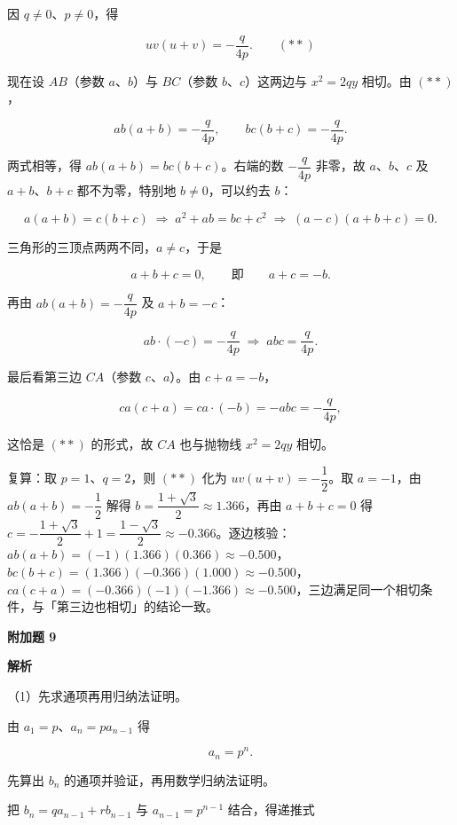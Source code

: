 \begin{answer}
因 $q\ne0$、$p\ne0$，得

\nopagebreak[4]
\[
uv(u+v)=-\frac{q}{4p}. \qquad (\ast\ast)
\]

现在设 $AB$（参数 $a$、$b$）与 $BC$（参数 $b$、$c$）这两边与 $x^2=2qy$ 相切。由 $(\ast\ast)$，

\nopagebreak[4]
\[
ab(a+b)=-\frac{q}{4p},\qquad bc(b+c)=-\frac{q}{4p}.
\]

两式相等，得 $ab(a+b)=bc(b+c)$。右端的数 $-\dfrac{q}{4p}$ 非零，故 $a$、$b$、$c$ 及 $a+b$、$b+c$ 都不为零，特别地 $b\ne0$，可以约去 $b$：

\nopagebreak[4]
\[
a(a+b)=c(b+c)
\;\Longrightarrow\;
a^2+ab=bc+c^2
\;\Longrightarrow\;
(a-c)(a+b+c)=0.
\]

三角形的三顶点两两不同，$a\ne c$，于是

\nopagebreak[4]
\[
a+b+c=0,\qquad\text{即}\qquad a+c=-b.
\]

再由 $ab(a+b)=-\dfrac{q}{4p}$ 及 $a+b=-c$：

\nopagebreak[4]
\[
ab\cdot(-c)=-\frac{q}{4p}
\;\Longrightarrow\;
abc=\frac{q}{4p}.
\]

最后看第三边 $CA$（参数 $c$、$a$）。由 $c+a=-b$，

\nopagebreak[4]
\[
ca(c+a)=ca\cdot(-b)=-abc=-\frac{q}{4p},
\]

这恰是 $(\ast\ast)$ 的形式，故 $CA$ 也与抛物线 $x^2=2qy$ 相切。

复算：取 $p=1$、$q=2$，则 $(\ast\ast)$ 化为 $uv(u+v)=-\dfrac12$。取 $a=-1$，由 $ab(a+b)=-\dfrac12$ 解得 $b=\dfrac{1+\sqrt3}{2}\approx1.366$，再由 $a+b+c=0$ 得 $c=-\dfrac{1+\sqrt3}{2}+1=\dfrac{1-\sqrt3}{2}\approx-0.366$。逐边核验：$ab(a+b)=(-1)(1.366)(0.366)\approx-0.500$，$bc(b+c)=(1.366)(-0.366)(1.000)\approx-0.500$，$ca(c+a)=(-0.366)(-1)(-1.366)\approx-0.500$，三边满足同一个相切条件，与「第三边也相切」的结论一致。

\textbf{附加题 9}

\textbf{解析}

（1）先求通项再用归纳法证明。

由 $a_1=p$、$a_n=pa_{n-1}$ 得

\nopagebreak[4]
\[
a_n=p^n.
\]

先算出 $b_n$ 的通项并验证，再用数学归纳法证明。

把 $b_n=qa_{n-1}+rb_{n-1}$ 与 $a_{n-1}=p^{n-1}$ 结合，得递推式


\end{answer}
